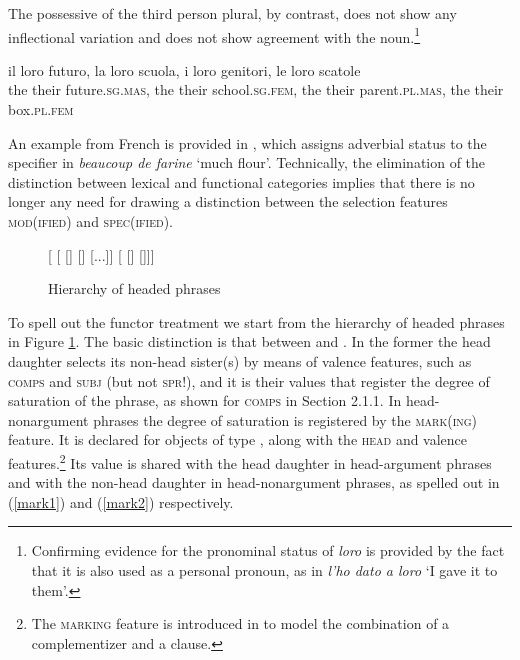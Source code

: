 \documentclass[output=paper
                ,modfonts
                ,nonflat
	        ,collection
	        ,collectionchapter
	        ,collectiontoclongg
 	        ,biblatex
                ,babelshorthands
                ,newtxmath
                ,draftmode
                ,colorlinks, citecolor=brown
]{./langsci/langscibook}
\begin{document}
\noindent
The possessive of the third person plural, by contrast, does not show any 
inflectional variation and does not show agreement with the 
noun.\footnote{Confirming evidence for the pronominal status of \emph{loro} is 
provided by the fact that it is also used as a personal pronoun, as in 
\emph{l'ho dato a loro} `I gave it to them'.}

\begin{exe} 
\ex 
\gll  il loro futuro, la loro scuola, i loro genitori, le loro scatole \\   
      the their future.\textsc{sg.mas}, the their school.\textsc{sg.fem}, the their parent.\textsc{pl.mas}, the their box.\textsc{pl.fem} \\ 
\end{exe}

\noindent
An example from French is provided in \citet{Abeilleetal04}, 
which assigns adverbial status to the specifier in 
\emph{beaucoup de farine} `much flour'.  
Technically, the elimination of the distinction between lexical and 
functional categories implies that there is no longer any need for 
drawing a distinction between the selection features \textsc{mod(ified)} and \textsc{spec(ified)}. 

\begin{figure}
	\centering
	\begin{forest}
[
	[
		[]
		[]
		[...]]
	[
		[]
		[]]]	
	\end{forest}
	\caption{\label{typ} Hierarchy of headed phrases}
\end{figure}

To spell out the functor treatment we start from the 
hierarchy of headed phrases in Figure \ref{typ}. The basic distinction is
that between  and . 
In the former the head daughter selects its non-head sister(s) by means of 
valence features, such as \textsc{comps} and \textsc{subj} (but not \textsc{spr}!), 
and it is their values that register the degree of saturation of the phrase, 
as shown for \textsc{comps} in Section 2.1.1.  
In head-nonargument phrases the degree of saturation is registered  
by the \textsc{mark(ing)} feature. It is declared for objects of type , 
along with the \textsc{head} and valence features.\footnote{The \textsc{marking} feature  
is introduced in \citet[46]{ps2} to model the combination of a complementizer 
and a clause.} Its value is shared with the head daughter in head-argument phrases
and with the non-head daughter in head-nonargument phrases, as spelled out in 
(\ref{mark1}) and (\ref{mark2}) respectively. 
\end{document}
